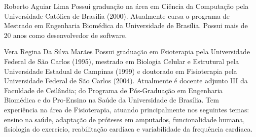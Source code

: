 \documentclass[journal]{IEEEtran}
\begin{document}
\begin{IEEEbiography}{Roberto Aguiar Lima}
	Possui graduação na área em Ciência da Computação pela Universidade Católica de Brasília (2000).
	Atualmente cursa o programa de Mestrado em Engenharia Biomédica da Universidade de Brasília.
	Possui mais de 20 anos como desenvolvedor de software.
\end{IEEEbiography}

\begin{IEEEbiography}{Vera Regina Da Silva Marães}
Possui graduação em Fsioterapia pela Universidade Federal de São Carlos (1995), mestrado em Biologia Celular e Estrutural pela Universidade Estadual de Campinas (1999) e doutorado em Fisioterapia pela Universidade Federal de São Carlos (2004). Atualmente é docente adjunto III da Faculdade de Ceilândia; do Programa de Pós-Graduação em Engenharia Biomédica e do Pro-Ensino na Saúde da Universidade de Brasília. Tem experiência na área de Fisioterapia, atuando principalmente nos seguintes temas: ensino na saúde, adaptação de próteses em amputados, funcionalidade humana, fisiologia do exercício, reabilitação cardíaca e variabilidade da frequência cardíaca.
\end{IEEEbiography}

\end{document}
